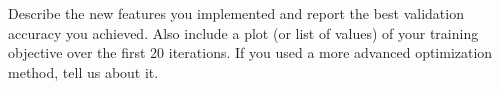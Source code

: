 \documentclass[10pt]{report}
\begin{document}
\begin{enumerate}
\begin{enumerate}
\vspace{0.5em}
Describe the new features you implemented and report the best validation accuracy you achieved. Also include a plot (or list of values) of your training objective over the first 20 iterations. If you used a more advanced optimization method, tell us about it.
\begin{solution}

\end{solution}


\end{enumerate}
\end{enumerate}
\end{document}
